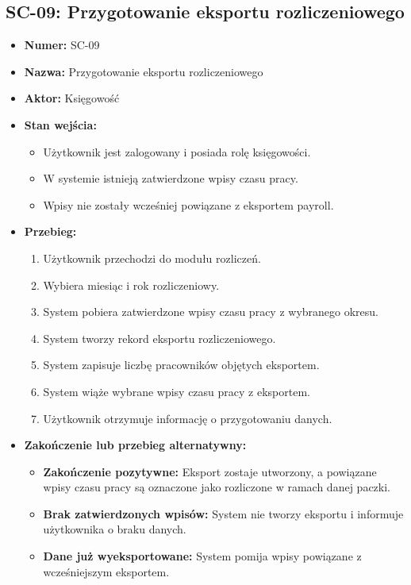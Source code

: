 \subsection{SC-09: Przygotowanie eksportu rozliczeniowego}
\begin{itemize}
    \item \textbf{Numer:} SC-09
    \item \textbf{Nazwa:} Przygotowanie eksportu rozliczeniowego
    \item \textbf{Aktor:} Księgowość
    \item \textbf{Stan wejścia:}
    \begin{itemize}
        \item Użytkownik jest zalogowany i posiada rolę księgowości.
        \item W systemie istnieją zatwierdzone wpisy czasu pracy.
        \item Wpisy nie zostały wcześniej powiązane z eksportem payroll.
    \end{itemize}
    \item \textbf{Przebieg:}
    \begin{enumerate}
        \item Użytkownik przechodzi do modułu rozliczeń.
        \item Wybiera miesiąc i rok rozliczeniowy.
        \item System pobiera zatwierdzone wpisy czasu pracy z wybranego okresu.
        \item System tworzy rekord eksportu rozliczeniowego.
        \item System zapisuje liczbę pracowników objętych eksportem.
        \item System wiąże wybrane wpisy czasu pracy z eksportem.
        \item Użytkownik otrzymuje informację o przygotowaniu danych.
    \end{enumerate}
    \item \textbf{Zakończenie lub przebieg alternatywny:}
    \begin{itemize}
        \item \textbf{Zakończenie pozytywne:} Eksport zostaje utworzony, a powiązane wpisy czasu pracy są oznaczone jako rozliczone w ramach danej paczki.
        \item \textbf{Brak zatwierdzonych wpisów:} System nie tworzy eksportu i informuje użytkownika o braku danych.
        \item \textbf{Dane już wyeksportowane:} System pomija wpisy powiązane z wcześniejszym eksportem.
    \end{itemize}
\end{itemize}

